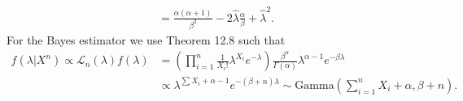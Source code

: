 \begin{itemize}
\begin{equation*}
\begin{split}
                &= \frac{\alpha(\alpha + 1)}{\beta^2} - 2\hat{\lambda} \frac{\alpha}{\beta} + \hat{\lambda}^2.
        \end{split}
    \end{equation*}
    For the Bayes estimator we use Theorem 12.8 such that
    \begin{equation*}
        \begin{split}
            f(\lambda|X^n) \propto \mathcal{L}_n(\lambda) f(\lambda)
                &= \left( \prod_{i = 1}^n \frac{1}{X_i!} \lambda^{X_i} e^{-\lambda} \right) \frac{\beta^{\alpha}}{\Gamma(\alpha)} \lambda^{\alpha - 1} e^{-\beta \lambda} \\
                &\propto \lambda^{\sum X_i + \alpha - 1} e^{-(\beta + n)\lambda}
                \sim \mathrm{Gamma}\left(\sum_{i = 1}^n X_i + \alpha, \beta + n\right).
        \end{split}
    \end{equation*}
\end{itemize}
